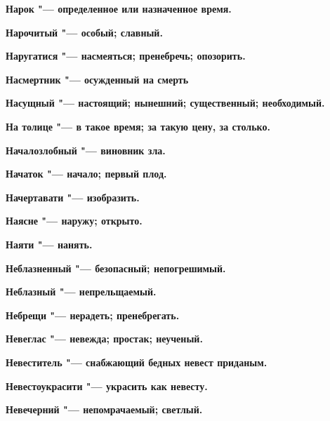\bfseries Нарок \normalfont{} "--- определенное или назначенное время. 




\bfseries Нарочитый \normalfont{} "--- особый; славный. 




\bfseries Наругатися \normalfont{} "--- насмеяться; пренебречь; опозорить. 




\bfseries Насмертник \normalfont{} "--- осужденный на смерть 




\bfseries Насущный \normalfont{} "--- настоящий; нынешний; существенный; необходимый. 




\bfseries На толице \normalfont{} "--- в такое время; за такую цену, за столько. 




\bfseries Началозлобный \normalfont{} "--- виновник зла. 




\bfseries Начаток \normalfont{} "--- начало; первый плод. 




\bfseries Начертавати \normalfont{} "--- изобразить. 




\bfseries Наясне \normalfont{} "--- наружу; открыто. 




\bfseries Наяти \normalfont{} "--- нанять. 




\bfseries Неблазненный \normalfont{} "--- безопасный; непогрешимый. 




\bfseries Неблазный \normalfont{} "--- непрельщаемый. 




\bfseries Небрещи \normalfont{} "--- нерадеть; пренебрегать. 




\bfseries Невеглас \normalfont{} "--- невежда; простак; неученый. 




\bfseries Невеститель \normalfont{} "--- снабжающий бедных невест приданым. 




\bfseries Невестоукрасити \normalfont{} "--- украсить как невесту. 




\bfseries Невечерний \normalfont{} "--- непомрачаемый; светлый. 




